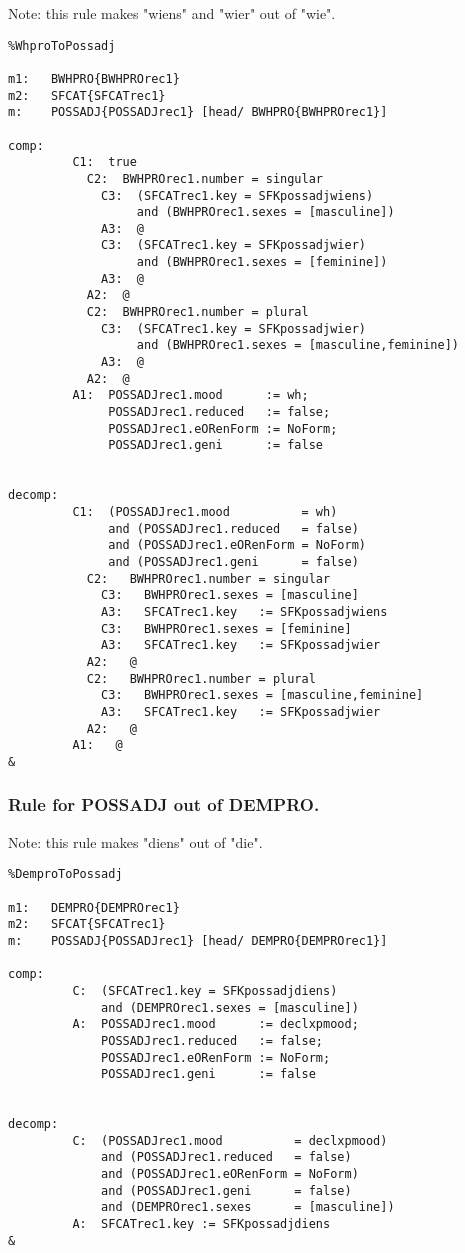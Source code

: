 Note: this rule makes "wiens" and "wier" out of "wie".
\begin{verbatim}
%WhproToPossadj

m1:   BWHPRO{BWHPROrec1}
m2:   SFCAT{SFCATrec1}
m:    POSSADJ{POSSADJrec1} [head/ BWHPRO{BWHPROrec1}]

comp:    
         C1:  true
           C2:  BWHPROrec1.number = singular
             C3:  (SFCATrec1.key = SFKpossadjwiens) 
                  and (BWHPROrec1.sexes = [masculine])
             A3:  @
             C3:  (SFCATrec1.key = SFKpossadjwier) 
                  and (BWHPROrec1.sexes = [feminine])
             A3:  @
           A2:  @
           C2:  BWHPROrec1.number = plural
             C3:  (SFCATrec1.key = SFKpossadjwier) 
                  and (BWHPROrec1.sexes = [masculine,feminine])
             A3:  @
           A2:  @
         A1:  POSSADJrec1.mood      := wh;
              POSSADJrec1.reduced   := false;
              POSSADJrec1.eORenForm := NoForm;
              POSSADJrec1.geni      := false


decomp:  
         C1:  (POSSADJrec1.mood          = wh) 
              and (POSSADJrec1.reduced   = false) 
              and (POSSADJrec1.eORenForm = NoForm) 
              and (POSSADJrec1.geni      = false)
           C2:   BWHPROrec1.number = singular
             C3:   BWHPROrec1.sexes = [masculine]
             A3:   SFCATrec1.key   := SFKpossadjwiens
             C3:   BWHPROrec1.sexes = [feminine]
             A3:   SFCATrec1.key   := SFKpossadjwier
           A2:   @
           C2:   BWHPROrec1.number = plural
             C3:   BWHPROrec1.sexes = [masculine,feminine]
             A3:   SFCATrec1.key   := SFKpossadjwier
           A2:   @
         A1:   @
&
\end{verbatim}
\newpage
\subsubsection{Rule for POSSADJ out of DEMPRO.}

Note: this rule makes "diens" out of "die".
\begin{verbatim}
%DemproToPossadj

m1:   DEMPRO{DEMPROrec1}
m2:   SFCAT{SFCATrec1}
m:    POSSADJ{POSSADJrec1} [head/ DEMPRO{DEMPROrec1}]

comp:    
         C:  (SFCATrec1.key = SFKpossadjdiens) 
             and (DEMPROrec1.sexes = [masculine])
         A:  POSSADJrec1.mood      := declxpmood;
             POSSADJrec1.reduced   := false;
             POSSADJrec1.eORenForm := NoForm;
             POSSADJrec1.geni      := false
             

decomp:  
         C:  (POSSADJrec1.mood          = declxpmood) 
             and (POSSADJrec1.reduced   = false) 
             and (POSSADJrec1.eORenForm = NoForm) 
             and (POSSADJrec1.geni      = false) 
             and (DEMPROrec1.sexes      = [masculine])
         A:  SFCATrec1.key := SFKpossadjdiens
&
\end{verbatim}
\newpage

